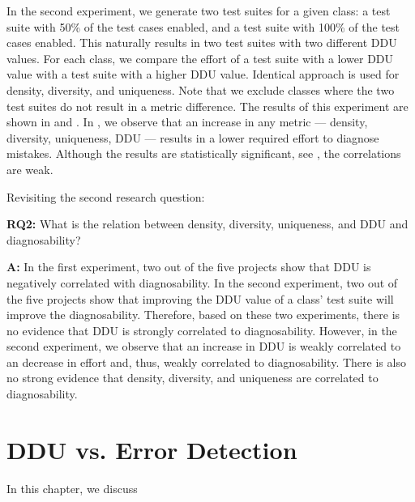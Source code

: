 \documentclass[twoside,a4paper,11pt]{memoir}
\begin{document}
In the second experiment, we generate two test suites for a given class: a test suite with 50\% of the test cases enabled, and a test suite with 100\% of the test cases enabled.
This naturally results in two test suites with two different DDU values.
For each class, we compare the effort of a test suite with a lower DDU value with a test suite with a higher DDU value.
Identical approach is used for density, diversity, and uniqueness.
Note that we exclude classes where the two test suites do not result in a metric difference.
The results of this experiment are shown in  and .
In , we observe that an increase in any metric --- density, diversity, uniqueness, DDU --- results in a lower required effort to diagnose mistakes.
Although the results are statistically significant, see , the correlations are weak.

Revisiting the second research question:
\begin{framed}
\noindent
\textbf{RQ2:} What is the relation between density, diversity, uniqueness, and DDU and diagnosability?
\end{framed}
\textbf{A:} In the first experiment, two out of the five projects show that DDU is negatively correlated with diagnosability.
In the second experiment, two out of the five projects show that improving the DDU value of a class' test suite will improve the diagnosability.
Therefore, based on these two experiments, there is no evidence that DDU is strongly correlated to diagnosability.
However, in the second experiment, we observe that an increase in DDU is weakly correlated to an decrease in effort and, thus, weakly correlated to diagnosability.
There is also no strong evidence that density, diversity, and uniqueness are correlated to diagnosability.

\chapter{DDU vs. Error Detection}
\label{ch:rq3}
In this chapter, we discuss
\end{document}
